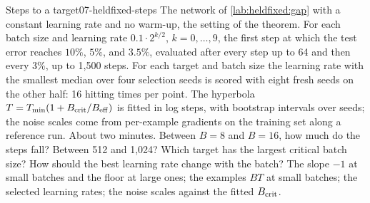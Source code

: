 \begin{refsection}
\begin{lab}{Steps to a target}{07-heldfixed-steps}\label{lab:heldfixed:steps}
 The network of \cref{lab:heldfixed:gap} with a constant learning rate and no warm-up, the setting of the theorem. For each batch size and learning rate $0.1\cdot2^{k/2}$, $k=0,\dots,9$, the first step at which the test error reaches $10\%$, $5\%$, and $3.5\%$, evaluated after every step up to 64 and then every 3\%, up to 1,500 steps. For each target and batch size the learning rate with the smallest median over four selection seeds is scored with eight fresh seeds on the other half: 16 hitting times per point. The hyperbola $T=T_{\min}(1+B_{\mathrm{crit}}/B_{\mathrm{eff}})$ is fitted in log steps, with bootstrap intervals over seeds; the noise scales come from per-example gradients on the training set along a reference run. About two minutes.
 Between $B=8$ and $B=16$, how much do the steps fall? Between 512 and 1,024? Which target has the largest critical batch size? How should the best learning rate change with the batch?
 The slope $-1$ at small batches and the floor at large ones; the examples $BT$ at small batches; the selected learning rates; the noise scales against the fitted $B_{\mathrm{crit}}$.
\end{lab}


\end{refsection}
